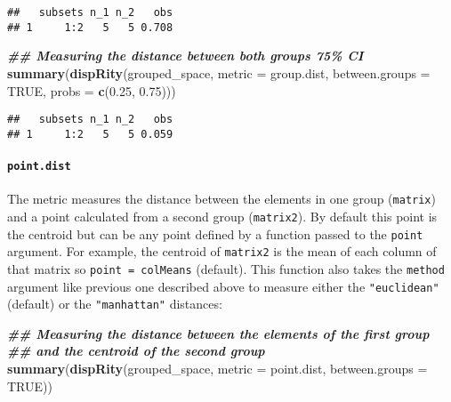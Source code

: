 \documentclass[
]{book}
\newenvironment{Shaded}{\begin{snugshade}}{\end{snugshade}}
\newcommand{\AttributeTok}[1]{\textcolor[rgb]{0.13,0.29,0.53}{#1}}
\newcommand{\ConstantTok}[1]{\textcolor[rgb]{0.56,0.35,0.01}{#1}}
\newcommand{\DocumentationTok}[1]{\textcolor[rgb]{0.56,0.35,0.01}{\textbf{\textit{#1}}}}
\newcommand{\FloatTok}[1]{\textcolor[rgb]{0.00,0.00,0.81}{#1}}
\newcommand{\FunctionTok}[1]{\textcolor[rgb]{0.13,0.29,0.53}{\textbf{#1}}}
\newcommand{\NormalTok}[1]{#1}
\begin{document}
\begin{verbatim}
##   subsets n_1 n_2   obs
## 1     1:2   5   5 0.708
\end{verbatim}

\begin{Shaded}
\begin{Highlighting}[]
\DocumentationTok{\#\# Measuring the distance between both group\textquotesingle{}s 75\% CI}
\FunctionTok{summary}\NormalTok{(}\FunctionTok{dispRity}\NormalTok{(grouped\_space, }\AttributeTok{metric =}\NormalTok{ group.dist,}
                 \AttributeTok{between.groups =} \ConstantTok{TRUE}\NormalTok{, }\AttributeTok{probs =} \FunctionTok{c}\NormalTok{(}\FloatTok{0.25}\NormalTok{, }\FloatTok{0.75}\NormalTok{)))}
\end{Highlighting}
\end{Shaded}

\begin{verbatim}
##   subsets n_1 n_2   obs
## 1     1:2   5   5 0.059
\end{verbatim}

\hypertarget{point.dist}{%
\paragraph{\texorpdfstring{\texttt{point.dist}}{point.dist}}\label{point.dist}}

The metric measures the distance between the elements in one group (\texttt{matrix}) and a point calculated from a second group (\texttt{matrix2}).
By default this point is the centroid but can be any point defined by a function passed to the \texttt{point} argument.
For example, the centroid of \texttt{matrix2} is the mean of each column of that matrix so \texttt{point\ =\ colMeans} (default).
This function also takes the \texttt{method} argument like previous one described above to measure either the \texttt{"euclidean"} (default) or the \texttt{"manhattan"} distances:

\begin{Shaded}
\begin{Highlighting}[]
\DocumentationTok{\#\# Measuring the distance between the elements of the first group}
\DocumentationTok{\#\# and the centroid of the second group}
\FunctionTok{summary}\NormalTok{(}\FunctionTok{dispRity}\NormalTok{(grouped\_space, }\AttributeTok{metric =}\NormalTok{ point.dist,}
                 \AttributeTok{between.groups =} \ConstantTok{TRUE}\NormalTok{))}
\end{Highlighting}
\end{Shaded}
\end{document}
